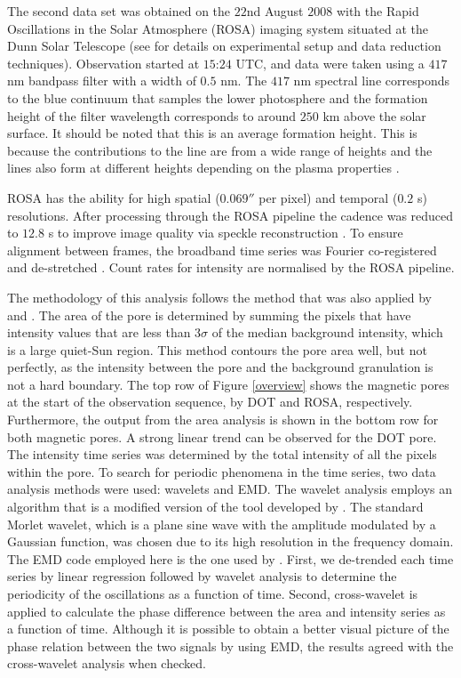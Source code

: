     The second data set was obtained on the $22$nd August $2008$ with the Rapid Oscillations in the Solar Atmosphere (ROSA) imaging system situated at the Dunn Solar Telescope (see \citealt{jess1} for details on experimental setup and data reduction techniques).
    Observation started at $15$:$24$ UTC, and data were taken using a $417$ nm bandpass filter with a width of $0.5$ nm.
    The $417$ nm spectral line corresponds to the blue continuum that samples the lower photosphere and the formation height of the filter wavelength corresponds to around $250$ km above the solar surface.
    It should be noted that this is an average formation height. 
    This is because the contributions to the line are from a wide range of heights and the lines also form at different heights depending on the plasma properties \citep{gband}.
    
    ROSA has the ability for high spatial ($0.069''$ per pixel) and temporal ($0.2$ s) resolutions.
    After processing through the ROSA pipeline the cadence was reduced to $12.8$ s to improve image quality via speckle reconstruction \citep{20764}.
    To ensure alignment between frames, the broadband time series was Fourier co-registered and de-stretched \citep{2007A&A...473..943J}.
    Count rates for intensity are normalised by the ROSA pipeline.
    
    The methodology of this analysis follows the method that was also applied by \citet{morton2011} and \cite{Dorotovic2014}.
    The area of the pore is determined by summing the pixels that have intensity values that are less than $3\sigma$ of the median background intensity, which is a large quiet-Sun region. 
    This method contours the pore area well, but not perfectly, as the intensity between the pore and the background granulation is not a hard boundary.
    The top row of Figure \ref{overview} shows the magnetic pores at the start of the observation sequence, by DOT and ROSA, respectively. 
    Furthermore, the output from the area analysis is shown in the bottom row for both magnetic pores.
    A strong linear trend can be observed for the DOT pore.
    The intensity time series was determined by the total intensity of all the pixels within the pore.
    To search for periodic phenomena in the time series, two data analysis methods were used: wavelets and EMD.
    The wavelet analysis employs an algorithm that is a modified version of the tool developed by \citet{torrence}.
    The standard Morlet wavelet, which is a plane sine wave with the amplitude modulated by a Gaussian function, was chosen due to its high resolution in the frequency domain.
    The EMD code employed here is the one used by \citet{terradas}.
    First, we de-trended each time series by linear regression followed by wavelet analysis to determine the periodicity of the oscillations as a function of time.
    Second, cross-wavelet is applied to calculate the phase difference between the area and intensity series as a function of time.
    Although it is possible to obtain a better visual picture of the phase relation between the two signals by using EMD, the results agreed with the cross-wavelet analysis when checked. 
    
